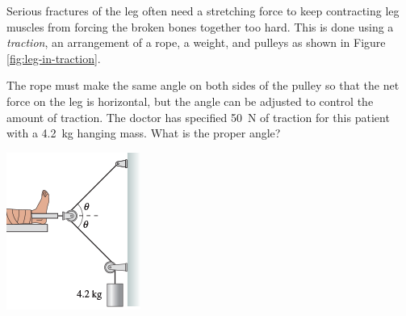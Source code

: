 \begin{Exercise}[title={Placing a leg in traction}, origin={knight}]
    Serious fractures of the leg often need a stretching force to keep
    contracting leg muscles from forcing the broken bones together too
    hard.  This is done using a \emph{traction}, an arrangement of a
    rope, a weight, and pulleys as shown in Figure~%
    \ref{fig:leg-in-traction}.

    The rope must make the same angle on both sides of the pulley so
    that the net force on the leg is horizontal, but the angle can be
    adjusted to control the amount of traction.  The doctor has
    specified \SI{50}{\newton} of traction for this patient with a \SI{4.2}
    {\kilo\gram} hanging mass.  What is the proper angle?

    \begin{center}
        \includegraphics[totalheight=0.2\textheight]{../figures/leg-in-traction.png}
        \label{fig:leg-in-traction}
    \end{center}
\end{Exercise}
